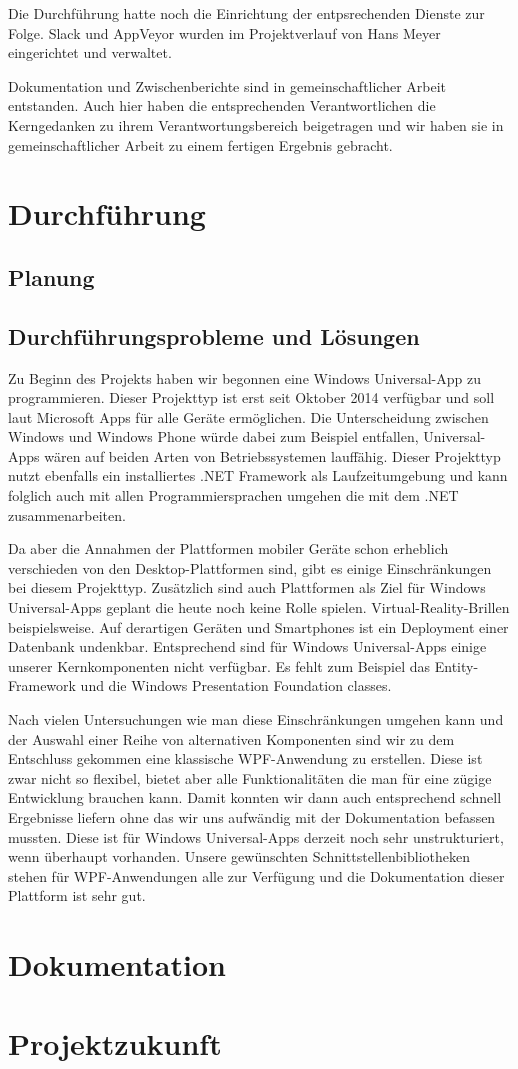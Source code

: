 \documentclass[12pt]{article}
\begin{document}
Die Durchführung hatte noch die Einrichtung der entpsrechenden Dienste zur Folge. Slack und AppVeyor wurden im Projektverlauf von Hans Meyer eingerichtet und verwaltet. 

Dokumentation und Zwischenberichte sind in gemeinschaftlicher Arbeit entstanden. Auch hier haben die entsprechenden Verantwortlichen die Kerngedanken zu ihrem Verantwortungsbereich beigetragen und wir haben sie in gemeinschaftlicher Arbeit zu einem fertigen Ergebnis gebracht.

\newpage
\section{Durchführung}
\subsection{Planung}
\subsection{Durchführungsprobleme und Lösungen}

Zu Beginn des Projekts haben wir begonnen eine Windows Universal-App zu programmieren. Dieser Projekttyp ist erst seit Oktober 2014 verfügbar und soll laut Microsoft Apps für alle Geräte ermöglichen. Die Unterscheidung zwischen Windows und Windows Phone würde dabei zum Beispiel entfallen, Universal-Apps wären auf beiden Arten von Betriebssystemen lauffähig. Dieser Projekttyp nutzt ebenfalls ein installiertes .NET Framework als Laufzeitumgebung und kann folglich auch mit allen Programmiersprachen umgehen die mit dem .NET zusammenarbeiten.
\newline

Da aber die Annahmen der Plattformen mobiler Geräte schon erheblich verschieden von den Desktop-Plattformen sind, gibt es einige Einschränkungen bei diesem Projekttyp. Zusätzlich sind auch Plattformen als Ziel für Windows Universal-Apps geplant die heute noch keine Rolle spielen. Virtual-Reality-Brillen beispielsweise. Auf derartigen Geräten und Smartphones ist ein Deployment einer Datenbank undenkbar. Entsprechend sind für Windows Universal-Apps einige unserer Kernkomponenten nicht verfügbar. Es fehlt zum Beispiel das Entity-Framework und die Windows Presentation Foundation classes.
\newline

Nach vielen Untersuchungen wie man diese Einschränkungen umgehen kann und der Auswahl einer Reihe von alternativen Komponenten sind wir zu dem Entschluss gekommen eine klassische WPF-Anwendung zu erstellen. Diese ist zwar nicht so flexibel, bietet aber alle Funktionalitäten die man für eine zügige Entwicklung brauchen kann. Damit konnten wir dann auch entsprechend schnell Ergebnisse liefern ohne das wir uns aufwändig mit der Dokumentation befassen mussten. Diese ist für Windows Universal-Apps derzeit noch sehr unstrukturiert, wenn überhaupt vorhanden. Unsere gewünschten Schnittstellenbibliotheken stehen für WPF-Anwendungen alle zur Verfügung und die Dokumentation dieser Plattform ist sehr gut.

\newpage
\section{Dokumentation}

\newpage
\section{Projektzukunft}
\end{document}
